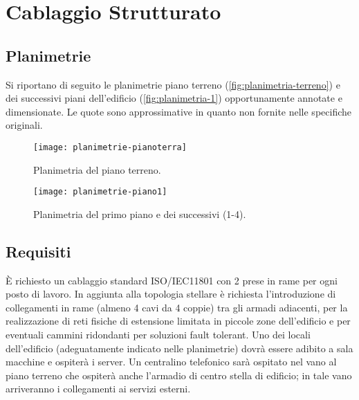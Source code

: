 
\chapter{Cablaggio Strutturato}

\section{Planimetrie}
Si riportano di seguito le planimetrie piano terreno (\autoref{fig:planimetria-terreno}) e dei successivi piani
dell'edificio (\autoref{fig:planimetria-1}) opportunamente annotate e dimensionate.
Le quote sono approssimative in quanto non fornite nelle specifiche originali.

\begin{figure}[ht]
    \texttt{[image: planimetrie-pianoterra]}
    \caption{Planimetria del piano terreno.}\label{fig:planimetria-terreno}
\end{figure}

\begin{figure}[ht]
    \texttt{[image: planimetrie-piano1]}
    \caption{Planimetria del primo piano e dei successivi (1-4).}\label{fig:planimetria-1}
\end{figure}

\newpage
\section{Requisiti}
È richiesto un cablaggio standard ISO/IEC11801 con \num{2} prese in rame per ogni posto di lavoro.
In aggiunta alla topologia stellare è richiesta l’introduzione di collegamenti in rame (almeno \num{4} cavi da \num{4} coppie)
tra gli armadi adiacenti, per la realizzazione di reti fisiche di estensione limitata in piccole zone dell’edificio
e per eventuali cammini ridondanti per soluzioni fault tolerant.
Uno dei locali dell’edificio (adeguatamente indicato nelle planimetrie) dovrà essere adibito a sala macchine e
ospiterà i server.
Un centralino telefonico sarà ospitato nel vano al piano terreno che ospiterà anche l’armadio di centro stella di
edificio; in tale vano arriveranno i collegamenti ai servizi esterni.
